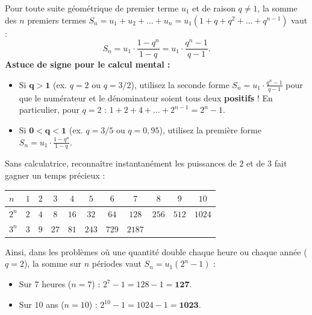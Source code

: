 \begin{theoreme}
Pour toute suite géométrique de premier terme $u_1$ et de raison $q \neq 1$, la somme des $n$ premiers termes $S_n = u_1 + u_2 + \dots + u_n = u_1(1 + q + q^2 + \dots + q^{n-1})$ vaut :
\[
    \boxed{S_n = u_1 \cdot \frac{1 - q^n}{1 - q} = u_1 \cdot \frac{q^n - 1}{q - 1}}.
\]
\textbf{Astuce de signe pour le calcul mental :}
\begin{itemize}
    \item Si $\mathbf{q > 1}$ (ex. $q = 2$ ou $q = 3/2$), utilisez la seconde forme $\boxed{S_n = u_1 \cdot \frac{q^n - 1}{q - 1}}$ pour que le numérateur et le dénominateur soient tous deux \textbf{positifs} ! En particulier, pour $q = 2$ : $\boxed{1 + 2 + 4 + \dots + 2^{n-1} = 2^n - 1}$.
    \item Si $\mathbf{0 < q < 1}$ (ex. $q = 3/5$ ou $q = 0,95$), utilisez la première forme $\boxed{S_n = u_1 \cdot \frac{1 - q^n}{1 - q}}$.
\end{itemize}
\end{theoreme}

\begin{astuce}
Sans calculatrice, reconnaître instantanément les puissances de $2$ et de $3$ fait gagner un temps précieux :
\begin{center}
\renewcommand{\arraystretch}{1.3}
\begin{tabular}{@{}lcccccccccc@{}}
\toprule
$n$ & $1$ & $2$ & $3$ & $4$ & $5$ & $6$ & $7$ & $8$ & $9$ & $10$ \\
\midrule
$2^n$ & $2$ & $4$ & $8$ & $16$ & $32$ & $64$ & $128$ & $256$ & $512$ & $1024$ \\
$3^n$ & $3$ & $9$ & $27$ & $81$ & $243$ & $729$ & $2187$ & & & \\
\bottomrule
\end{tabular}
\end{center}
Ainsi, dans les problèmes où une quantité double chaque heure ou chaque année ($q = 2$), la somme sur $n$ périodes vaut $S_n = u_1(2^n - 1)$ :
\begin{itemize}
    \item Sur $7$ heures ($n = 7$) : $2^7 - 1 = 128 - 1 = \mathbf{127}$.
    \item Sur $10$ ans ($n = 10$) : $2^{10} - 1 = 1024 - 1 = \mathbf{1023}$.
\end{itemize}
\end{astuce}

